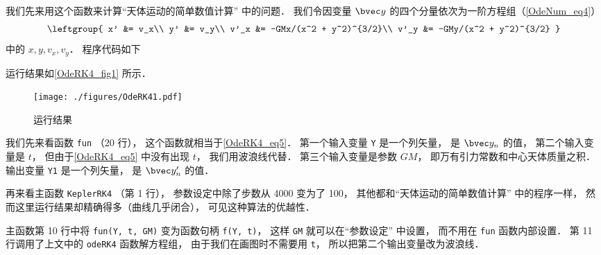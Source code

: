我们先来用这个函数来计算“天体运动的简单数值计算” 中的问题． 我们令因变量 $\bvec y$ 的四个分量依次为一阶方程组（\autoref{OdeNum_eq4}）
\begin{equation}\label{OdeRK4_eq5}
\leftgroup{
x' &= v_x\\
y' &= v_y\\
v'_x &= -GMx/(x^2 + y^2)^{3/2}\\
v'_y &= -GMy/(x^2 + y^2)^{3/2}
}\end{equation}
中的 $x, y, v_x, v_y$． 程序代码如下


运行结果如\autoref{OdeRK4_fig1} 所示．

\begin{figure}[ht]
\centering
\texttt{[image: ./figures/OdeRK41.pdf]}
\caption{运行结果} \label{OdeRK4_fig1}
\end{figure}

我们先来看函数 \lstinline|fun| （20 行）， 这个函数就相当于\autoref{OdeRK4_eq5}． 第一个输入变量 \lstinline|Y| 是一个列矢量， 是 $\bvec y_n$ 的值， 第二个输入变量是 $t$， 但由于\autoref{OdeRK4_eq5} 中没有出现 $t$， 我们用波浪线代替． 第三个输入变量是参数 $GM$， 即万有引力常数和中心天体质量之积． 输出变量 \lstinline|Y1| 是一个列矢量， 是 $\bvec y'_n$ 的值．

再来看主函数 \lstinline|KeplerRK4| （第 1 行）， 参数设定中除了步数从 4000 变为了 100， 其他都和“天体运动的简单数值计算” 中的程序一样， 然而这里运行结果却精确得多（曲线几乎闭合）， 可见这种算法的优越性．

主函数第 10 行中将 \lstinline|fun(Y, t, GM)| 变为函数句柄 \lstinline|f(Y, t)|， 这样 \lstinline|GM| 就可以在“参数设定” 中设置， 而不用在 \lstinline|fun| 函数内部设置． 第 11 行调用了上文中的 \lstinline|odeRK4| 函数解方程组， 由于我们在画图时不需要用 \lstinline|t|， 所以把第二个输出变量改为波浪线．

